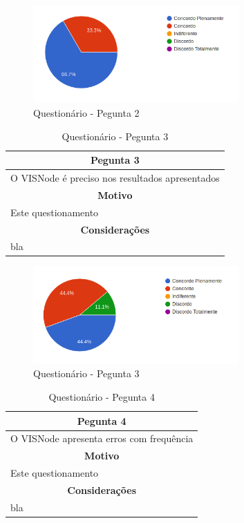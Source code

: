 \documentclass[
	12pt,				%
	oneside,			%
	a4paper,			%
	english,			%
	french,				%
	spanish,			%
	brazil,				%
	]{abntex2}
\begin{document}
\begin{figure}[H]
\centering
\caption{Questionário - Pegunta 2}
\includegraphics[width=0.7\textwidth]{imagens/v1/p2.png}
\sourceAuthor
\end{figure}

\begin{table}[H]
\centering
\caption{Questionário - Pegunta 3} 
\def\arraystretch{1.5}
\begin{tabular}{l}
\hline
\multicolumn{1}{c}{\textbf{Pegunta 3}}              \\ \hline
O VISNode é preciso nos resultados apresentados \\ \hline
\multicolumn{1}{c}{\textbf{Motivo}}                 \\ \hline
Este questionamento                                   \\ \hline
\multicolumn{1}{c}{\textbf{Considerações}}          \\ \hline
bla                                                   \\ \hline
\end{tabular}
\sourceAuthor
\end{table}

\begin{figure}[H]
\centering
\caption{Questionário - Pegunta 3}
\includegraphics[width=0.7\textwidth]{imagens/v1/p3.png}
\sourceAuthor
\end{figure}

\begin{table}[H]
\centering
\caption{Questionário - Pegunta 4} 
\def\arraystretch{1.5}
\begin{tabular}{l}
\hline
\multicolumn{1}{c}{\textbf{Pegunta 4}}              \\ \hline
O VISNode apresenta erros com frequência \\ \hline
\multicolumn{1}{c}{\textbf{Motivo}}                 \\ \hline
Este questionamento                                   \\ \hline
\multicolumn{1}{c}{\textbf{Considerações}}          \\ \hline
bla                                                   \\ \hline
\end{tabular}
\sourceAuthor
\end{table}
\end{document}
